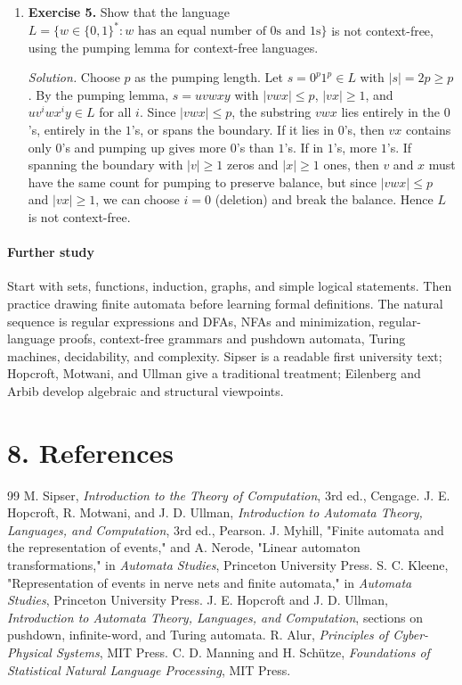 \begin{enumerate}[leftmargin=*,itemsep=0.9em]
\item \textbf{Exercise 5.} Show that the language $L=\{w\in\{0,1\}^*: w\text{ has an equal number of 0s and 1s}\}$ is not context-free, using the pumping lemma for context-free languages.

\emph{Solution.} Choose $p$ as the pumping length. Let $s=0^p1^p\in L$ with $|s|=2p\ge p$. By the pumping lemma, $s=uvwxy$ with $|vwx|\le p$, $|vx|\ge 1$, and $uv^iwx^iy\in L$ for all $i$. Since $|vwx|\le p$, the substring $vwx$ lies entirely in the $0$'s, entirely in the $1$'s, or spans the boundary. If it lies in $0$'s, then $vx$ contains only $0$'s and pumping up gives more $0$'s than $1$'s. If in $1$'s, more $1$'s. If spanning the boundary with $|v|\ge 1$ zeros and $|x|\ge 1$ ones, then $v$ and $x$ must have the same count for pumping to preserve balance, but since $|vwx|\le p$ and $|vx|\ge 1$, we can choose $i=0$ (deletion) and break the balance. Hence $L$ is not context-free.

\end{enumerate}

\paragraph{Further study}

Start with sets, functions, induction, graphs, and simple logical statements. Then practice drawing finite automata before learning formal definitions. The natural sequence is regular expressions and DFAs, NFAs and minimization, regular-language proofs, context-free grammars and pushdown automata, Turing machines, decidability, and complexity. Sipser is a readable first university text; Hopcroft, Motwani, and Ullman give a traditional treatment; Eilenberg and Arbib develop algebraic and structural viewpoints.
\section*{8. References}
\begin{thebibliography}{99}
 M. Sipser, \emph{Introduction to the Theory of Computation}, 3rd ed., Cengage.
 J. E. Hopcroft, R. Motwani, and J. D. Ullman, \emph{Introduction to Automata Theory, Languages, and Computation}, 3rd ed., Pearson.
 J. Myhill, "Finite automata and the representation of events," and A. Nerode, "Linear automaton transformations," in \emph{Automata Studies}, Princeton University Press.
 S. C. Kleene, "Representation of events in nerve nets and finite automata," in \emph{Automata Studies}, Princeton University Press.
 J. E. Hopcroft and J. D. Ullman, \emph{Introduction to Automata Theory, Languages, and Computation}, sections on pushdown, infinite-word, and Turing automata.
 R. Alur, \emph{Principles of Cyber-Physical Systems}, MIT Press.
 C. D. Manning and H. Schütze, \emph{Foundations of Statistical Natural Language Processing}, MIT Press.
\end{thebibliography}
